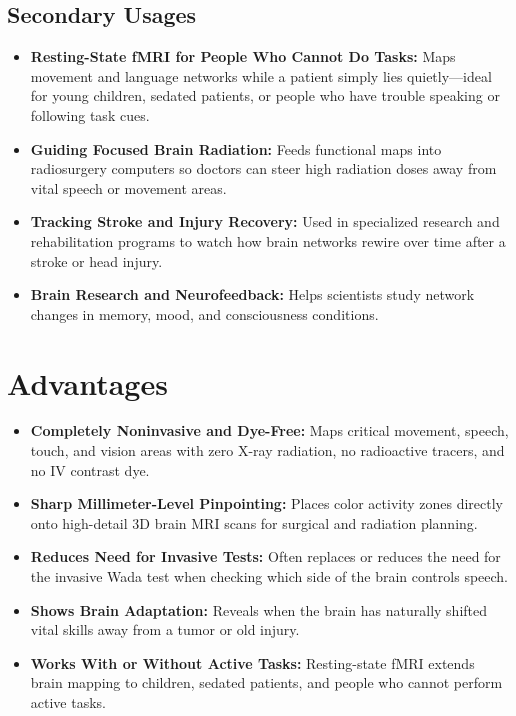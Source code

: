 \subsection{Secondary Usages}

\begin{itemize}
    \item \textbf{Resting-State fMRI for People Who Cannot Do Tasks:} Maps movement and language networks while a patient simply lies quietly---ideal for young children, sedated patients, or people who have trouble speaking or following task cues.
    \item \textbf{Guiding Focused Brain Radiation:} Feeds functional maps into radiosurgery computers so doctors can steer high radiation doses away from vital speech or movement areas.
    \item \textbf{Tracking Stroke and Injury Recovery:} Used in specialized research and rehabilitation programs to watch how brain networks rewire over time after a stroke or head injury.
    \item \textbf{Brain Research and Neurofeedback:} Helps scientists study network changes in memory, mood, and consciousness conditions.
\end{itemize}

\section{Advantages}

\begin{itemize}
    \item \textbf{Completely Noninvasive and Dye-Free:} Maps critical movement, speech, touch, and vision areas with zero X-ray radiation, no radioactive tracers, and no IV contrast dye.
    \item \textbf{Sharp Millimeter-Level Pinpointing:} Places color activity zones directly onto high-detail 3D brain MRI scans for surgical and radiation planning.
    \item \textbf{Reduces Need for Invasive Tests:} Often replaces or reduces the need for the invasive Wada test when checking which side of the brain controls speech.
    \item \textbf{Shows Brain Adaptation:} Reveals when the brain has naturally shifted vital skills away from a tumor or old injury.
    \item \textbf{Works With or Without Active Tasks:} Resting-state fMRI extends brain mapping to children, sedated patients, and people who cannot perform active tasks.
\end{itemize}


